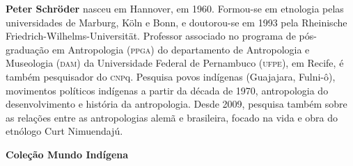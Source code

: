 \textbf{Peter Schröder} nasceu em Hannover, em 1960. Formou-se em etnologia pelas universidades de Marburg, Köln e Bonn, e doutorou-se em 1993 pela Rheinische Friedrich-Wilhelms-Universität. Professor associado no programa de pós-graduação em Antropologia (\textsc{ppga}) do departamento de Antropologia e Museologia (\textsc{dam}) da Universidade Federal de Pernambuco (\textsc{ufpe}), em Recife, é também pesquisador do \textsc{cnp}q. Pesquisa povos indígenas (Guajajara, Fulni-ô), movimentos políticos indígenas a partir da década de 1970, antropologia do desenvolvimento e história da antropologia. Desde 2009, pesquisa também sobre as relações entre as antropologias alemã e brasileira, focado na vida e obra do etnólogo Curt Nimuendajú.

\textbf{Coleção Mundo Indígena} \lipsum[2]


